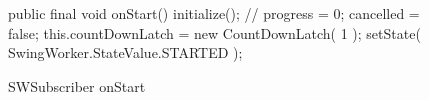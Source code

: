 \begin{figure}[h]
\begin{sourcecode}
\begin{javacode}{}
public final void onStart() {
	initialize(); // progress = 0; cancelled = false;
	this.countDownLatch = new CountDownLatch( 1 );
	setState( SwingWorker.StateValue.STARTED );
}
\end{javacode}
\caption{SWSubscriber onStart}
\label{code:swsubscriber-onstart}
\end{sourcecode}
\end{figure}